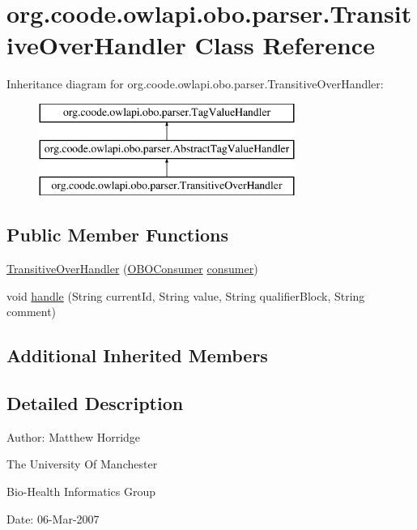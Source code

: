 \hypertarget{classorg_1_1coode_1_1owlapi_1_1obo_1_1parser_1_1_transitive_over_handler}{\section{org.\-coode.\-owlapi.\-obo.\-parser.\-Transitive\-Over\-Handler Class Reference}
\label{classorg_1_1coode_1_1owlapi_1_1obo_1_1parser_1_1_transitive_over_handler}
}
Inheritance diagram for org.\-coode.\-owlapi.\-obo.\-parser.\-Transitive\-Over\-Handler\-:\begin{figure}[H]
\begin{center}
\leavevmode
\includegraphics[height=3.000000cm]{classorg_1_1coode_1_1owlapi_1_1obo_1_1parser_1_1_transitive_over_handler}
\end{center}
\end{figure}
\subsection*{Public Member Functions}
\begin{DoxyCompactItemize}
\item 
\hyperlink{classorg_1_1coode_1_1owlapi_1_1obo_1_1parser_1_1_transitive_over_handler_ae8418d56852b735da7f36feba3161dd4}{Transitive\-Over\-Handler} (\hyperlink{classorg_1_1coode_1_1owlapi_1_1obo_1_1parser_1_1_o_b_o_consumer}{O\-B\-O\-Consumer} \hyperlink{classorg_1_1coode_1_1owlapi_1_1obo_1_1parser_1_1_abstract_tag_value_handler_ab27f1ff22d15640c5f81585f18265137}{consumer})
\item 
void \hyperlink{classorg_1_1coode_1_1owlapi_1_1obo_1_1parser_1_1_transitive_over_handler_a7e61ef4998f2bf7e57248efb2301b067}{handle} (String current\-Id, String value, String qualifier\-Block, String comment)
\end{DoxyCompactItemize}
\subsection*{Additional Inherited Members}


\subsection{Detailed Description}
Author\-: Matthew Horridge\par
 The University Of Manchester\par
 Bio-\/\-Health Informatics Group\par
 Date\-: 06-\/\-Mar-\/2007\par
\par
 

